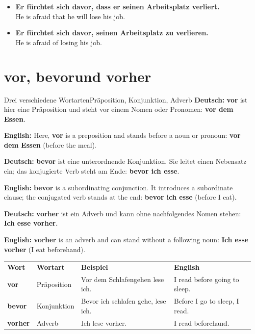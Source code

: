 \documentclass[a4paper,11pt]{article}
\newcommand{\GermanText}[1]{\textbf{Deutsch: }#1\par}
\newcommand{\EnglishText}[1]{{\small\color{SoftGray}\textbf{English: }#1\par}}
\newcommand{\ExampleItem}[2]{\item \textbf{#1}\\{\small\color{SoftGray}#2}}
\begin{document}
        \begin{exbox}
            \begin{itemize}
                \ExampleItem{Er fürchtet sich davor, dass er seinen Arbeitsplatz verliert.}{He is afraid that he will lose his job.}
                \ExampleItem{Er fürchtet sich davor, seinen Arbeitsplatz zu verlieren.}{He is afraid of losing his job.}
            \end{itemize}
        \end{exbox}


    \section{\glqq vor\grqq, \glqq bevor\grqq und \glqq vorher\grqq}

        \begin{grammarentry}{Drei verschiedene Wortarten}{Präposition, Konjunktion, Adverb}
            \GermanText{\textbf{vor} ist hier eine Präposition und steht vor einem Nomen oder Pronomen: \textbf{vor dem Essen}.}
            \EnglishText{Here, \textbf{vor} is a preposition and stands before a noun or pronoun: \textbf{vor dem Essen} (before the meal).}

            \GermanText{\textbf{bevor} ist eine unterordnende Konjunktion. Sie leitet einen Nebensatz ein; das konjugierte Verb steht am Ende: \textbf{bevor ich esse}.}
            \EnglishText{\textbf{bevor} is a subordinating conjunction. It introduces a subordinate clause; the conjugated verb stands at the end: \textbf{bevor ich esse} (before I eat).}

            \GermanText{\textbf{vorher} ist ein Adverb und kann ohne nachfolgendes Nomen stehen: \textbf{Ich esse vorher}.}
            \EnglishText{\textbf{vorher} is an adverb and can stand without a following noun: \textbf{Ich esse vorher} (I eat beforehand).}
        \end{grammarentry}

        \begin{longtable}{>{\bfseries}p{2.6cm}p{3.6cm}p{4.7cm}p{4.1cm}}
            \rowcolor{HeaderBlueDark}
            \color{white}\textbf{Wort} &
            \color{white}\textbf{Wortart} &
            \color{white}\textbf{Beispiel} &
            \color{white}\textbf{English} \\
            vor & Präposition & Vor dem Schlafengehen lese ich. & I read before going to sleep. \\
            bevor & Konjunktion & Bevor ich schlafen gehe, lese ich. & Before I go to sleep, I read. \\
            vorher & Adverb & Ich lese vorher. & I read beforehand. \\
        \end{longtable}
\end{document}
